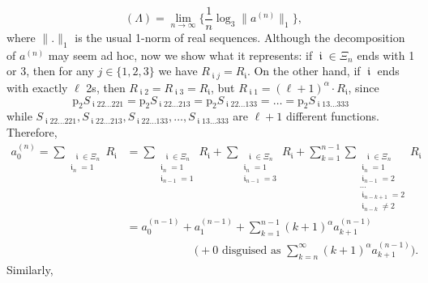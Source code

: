 \documentclass[a4paper, 11pt]{article}
\DeclareMathOperator{\iii}{\mathfrak{i}}
\DeclareMathOperator{\dH}{\dim_{\mathrm{H}}}
\numberwithin{equation}{section}
\theoremstyle{plain}
\theoremstyle{remark}
\theoremstyle{definition}
\begin{document}
\begin{equation*}
\dH(\Lambda) = \lim_{n \to \infty}\bigg\{\frac{1}{n}\log_{3}\| a^{(n)} \|_1\bigg\},
\end{equation*}
where $\|.\|_1$ is the usual 1-norm of real sequences.
Although the decomposition of $a^{(n)}$ may seem ad hoc, now we show what it represents: if $\iii \in \Xi_n$ ends with 1 or 3, then for any $j \in \{1,2,3\}$ we have $R_{\iii j} = R_{\iii}$. On the other hand, if $\iii$ ends with exactly $\ell$ 2s, then $R_{\iii 2} = R_{\iii 3} = R_{\iii}$, but $R_{\iii 1} = (\ell+1)^\alpha \cdot R_{\iii}$, since
\begin{equation*}
\mathrm{p}_2S_{\iii22\dots221} = \mathrm{p}_2S_{\iii22\dots213} = \mathrm{p}_2S_{\iii22\dots133} = \dots = \mathrm{p}_2S_{\iii13\dots333}
\end{equation*}
while $S_{\iii22\dots221}, S_{\iii22\dots213}, S_{\iii22\dots133}, \dots , S_{\iii13\dots333}$ are $\ell + 1$ different functions. Therefore,
\begin{equation*}\begin{aligned}
a_0^{(n)} = \sum_{\substack{\ \ \ \iii \in \Xi_n \\ \iii_n = 1}} R_{\iii} &= \sum_{\substack{\ \ \ \iii \in \Xi_n \\ \iii_n = 1 \\ \iii_{n-1} = 1}} R_{\iii} + \sum_{\substack{\ \ \ \iii \in \Xi_n \\ \iii_n = 1 \\ \iii_{n-1} = 3}} R_{\iii} + \sum_{k=1}^{n-1}\sum_{\substack{\ \ \ \iii \in \Xi_n \\ \iii_n = 1 \\ \iii_{n-1} = 2 \\ \dots \\ \iii_{n-k+1} = 2 \\ \iii_{n-k} \neq 2}} R_{\iii} \\
&= a_0^{(n-1)} + a_1^{(n-1)} + \sum_{k=1}^{n-1} (k+1)^\alpha a_{k+1}^{(n-1)} \\
&\qquad\qquad\qquad \Big( + 0 \text{ disguised as } \sum_{k=n}^{\infty} (k+1)^\alpha a_{k+1}^{(n-1)} \Big).
\end{aligned}\end{equation*}
Similarly,
\end{document}
